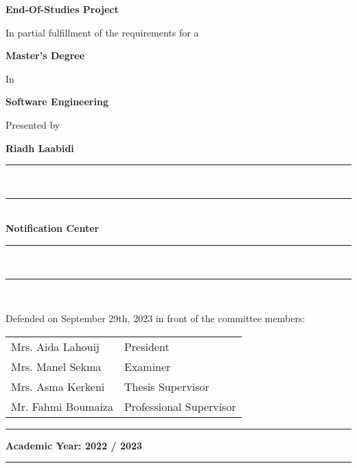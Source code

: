 \begin{titlepage}
\begin{center}
        \vspace{2cm}

        \Huge\textbf{End-Of-Studies Project}

        \vspace{1.5cm}

        \normalsize In partial fulfillment of the requirements for a

        \Large\textbf{Master's Degree}

        \normalsize In

        \Large\textbf{Software Engineering}

        \normalsize Presented by

        \large{\textbf{Riadh Laabidi}}
        \vspace{0.5cm}

        \rule[5pt]{0.5\textwidth}{0.5px}\\
        \vspace{-16px}
        \rule[10pt]{0.5\textwidth}{2.5px} \\
        \LARGE{\textbf{Notification Center}} \\
        \rule[5pt]{0.5\textwidth}{0.5px}\\
        \vspace{-15px}
        \rule[10pt]{0.5\textwidth}{2.5px} \\


        \vspace{1cm}

        \small Defended on September 29th, 2023 in front of the committee members:

        \renewcommand\arraystretch{1}
        \begin{tabular}{m{} l }
            Mrs. Aida Lahouij  & President               \\
            Mrs. Manel Sekma   & Examiner                \\
            Mrs. Asma Kerkeni  & Thesis Supervisor       \\
            Mr. Fahmi Boumaiza & Professional Supervisor
        \end{tabular}
    \end{center}
    \vfill
    \centering
    \rule[0.5px]{30px}{0.5px} \space \footnotesize \textbf{Academic Year: 2022 / 2023} \space \rule[0.5px]{30px}{0.5px}
\end{titlepage}
\cleardoublepage